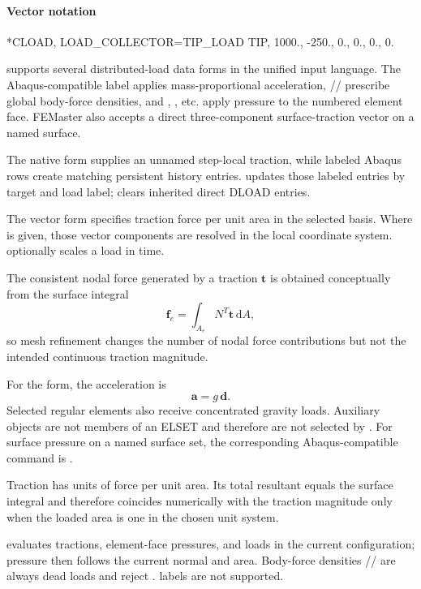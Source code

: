 \paragraph*{Vector notation}
\begin{inputdeck}
*CLOAD, LOAD_COLLECTOR=TIP_LOAD
TIP, 1000., -250., 0., 0., 0., 0.
\end{inputdeck}


 supports several distributed-load data forms in the
unified input language. The Abaqus-compatible  label applies
mass-proportional acceleration, // prescribe
global body-force densities, and , , etc. apply
pressure to the numbered element face. FEMaster also accepts a
direct three-component surface-traction vector on a named surface.

The native  form supplies an unnamed step-local traction, while labeled Abaqus rows  create matching persistent history entries.  updates those labeled entries by target and load label;  clears inherited direct DLOAD entries.

The vector form specifies traction force per unit area in the selected
basis. Where  is given, those vector components are
resolved in the local coordinate system.  optionally
scales a load in time.

The consistent nodal force generated by a traction \(\boldsymbol t\) is obtained conceptually from the surface integral
\[
\boldsymbol f_e
=\int_{A_e} N^T\boldsymbol t\,\mathrm dA,
\]
so mesh refinement changes the number of nodal force contributions but not the intended continuous traction magnitude.

For the  form, the acceleration is
\[
\boldsymbol a=g\,\boldsymbol d.
\]
Selected regular  elements also receive concentrated
gravity loads. Auxiliary  objects are not members
of an ELSET and therefore are not selected by .
For surface pressure on a named surface set, the corresponding
Abaqus-compatible command is .

Traction has units of force per unit area. Its total resultant equals the surface integral and therefore coincides numerically with the traction magnitude only when the loaded area is one in the chosen unit system.

 evaluates tractions, element-face pressures, and  loads in the current configuration; pressure then follows the current normal and area. Body-force densities // are always dead loads and reject .  labels are not supported.

